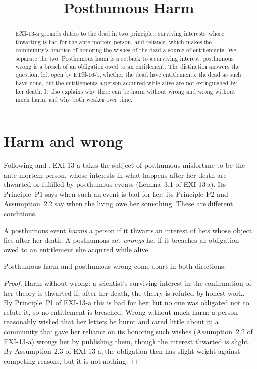 \documentclass{situationist-preprint}
\title{Posthumous Harm}
\begin{document}
\maketitle

\begin{abstract}
EXI-13-a grounds duties to the dead in two principles: surviving interests, whose thwarting is bad for the ante-mortem person, and reliance, which makes the community's practice of honoring the wishes of the dead a source of entitlements. We separate the two. Posthumous harm is a setback to a surviving interest; posthumous wrong is a breach of an obligation owed to an entitlement. The distinction answers the question, left open by ETH-16-b, whether the dead have entitlements: the dead as such have none, but the entitlements a person acquired while alive are not extinguished by her death. It also explains why there can be harm without wrong and wrong without much harm, and why both weaken over time.
\end{abstract}

\section{Harm and wrong}

Following \citet{Feinberg1984} and \citet{Pitcher1984}, EXI-13-a takes the subject of posthumous misfortune to be the ante-mortem person, whose interests in what happens after her death are thwarted or fulfilled by posthumous events (Lemma~3.1 of EXI-13-a). Its Principle~P1 says when such an event is bad for her; its Principle~P2 and Assumption~2.2 say when the living owe her something. These are different conditions.

\begin{definition}\label{d:hw}
A posthumous event \emph{harms} a person if it thwarts an interest of hers whose object lies after her death. A posthumous act \emph{wrongs} her if it breaches an obligation owed to an entitlement she acquired while alive.
\end{definition}

\begin{proposition}\label{p:apart}
Posthumous harm and posthumous wrong come apart in both directions.
\end{proposition}

\begin{proof}
Harm without wrong: a scientist's surviving interest in the confirmation of her theory is thwarted if, after her death, the theory is refuted by honest work. By Principle~P1 of EXI-13-a this is bad for her; but no one was obligated not to refute it, so no entitlement is breached. Wrong without much harm: a person reasonably wished that her letters be burnt and cared little about it; a community that gave her reliance on its honoring such wishes (Assumption~2.2 of EXI-13-a) wrongs her by publishing them, though the interest thwarted is slight. By Assumption~2.3 of EXI-13-a, the obligation then has slight weight against competing reasons, but it is not nothing.
\end{proof}
\end{document}
